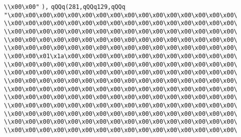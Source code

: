 \verb|\\x00\x00"|\newline
\verb|),|\newline
\verb|qQQq(281,qQQq129,qQQq|\newline
\verb|"\x00\x00\x00\x00\x00\x00\x00\x00\x00\x00\x00\x00\x00\x00\x00\x00\|\newline
\verb|\\x00\x00\x00\x00\x00\x00\x00\x00\x00\x00\x00\x00\x00\x00\x00\x00\|\newline
\verb|\\x00\x00\x00\x00\x00\x00\x00\x00\x00\x00\x00\x00\x00\x00\x00\x00\|\newline
\verb|\\x00\x00\x00\x00\x00\x00\x00\x00\x00\x00\x00\x00\x00\x00\x00\x00\|\newline
\verb|\\x00\x00\x00\x00\x00\x00\x00\x00\x00\x00\x00\x00\x00\x00\x00\x00\|\newline
\verb|\\x00\x00\x01\x1a\x00\x00\x00\x00\x00\x00\x00\x00\x00\x00\x00\x00\|\newline
\verb|\\x00\x00\x00\x00\x00\x00\x00\x00\x00\x00\x00\x00\x00\x00\x00\x00\|\newline
\verb|\\x00\x00\x00\x00\x00\x00\x00\x00\x00\x00\x00\x00\x00\x00\x00\x00\|\newline
\verb|\\x00\x00\x00\x00\x00\x00\x00\x00\x00\x00\x00\x00\x00\x00\x00\x00\|\newline
\verb|\\x00\x00\x00\x00\x00\x00\x00\x00\x00\x00\x00\x00\x00\x00\x00\x00\|\newline
\verb|\\x00\x00\x00\x00\x00\x00\x00\x00\x00\x00\x00\x00\x00\x00\x00\x00\|\newline
\verb|\\x00\x00\x00\x00\x00\x00\x00\x00\x00\x00\x00\x00\x00\x00\x00\x00\|\newline
\verb|\\x00\x00\x00\x00\x00\x00\x00\x00\x00\x00\x00\x00\x00\x00\x00\x00\|\newline
\verb|\\x00\x00\x00\x00\x00\x00\x00\x00\x00\x00\x00\x00\x00\x00\x00\x00\|\newline
\verb|\\x00\x00\x00\x00\x00\x00\x00\x00\x00\x00\x00\x00\x00\x00\x00\x00\|\newline
